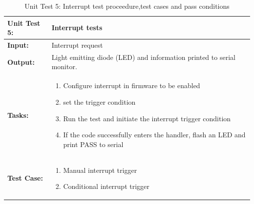 \begin{table}[H]
    \centering
    \caption{Unit Test 5: Interrupt test proceedure,test cases and pass conditions}
    \begin{tabular}{|m{}|m{}|}
    \hline
       \textbf{Unit Test 5: }  &  Interrupt tests\\
       \hline
        \textbf{Input: } &  Interrupt request\\
        \hline
        \textbf{Output: } & Light emitting diode (LED) and information printed to serial monitor.\\
        \hline
        \textbf{Tasks: } & \begin{enumerate}
        \vspace{1mm}
            \item Configure interrupt in firmware to be enabled
            \item set the trigger condition
            \item Run the test and initiate the interrupt trigger condition
            \item If the code successfully enters the handler, flash an LED and print PASS to serial
        \end{enumerate}\\
        \hline
        \textbf{Test Case: } & \begin{enumerate}
            \vspace{1mm}
            \item Manual interrupt trigger
            \item Conditional interrupt trigger
            
        \end{enumerate}\\
        \hline
    \end{tabular}

    \label{tab:UT005}
\end{table}

